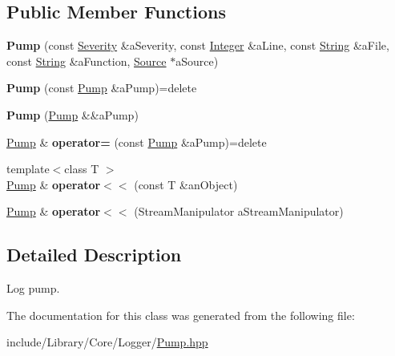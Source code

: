 \subsection*{Public Member Functions}
\begin{DoxyCompactItemize}
\item 
\mbox{\label{classlibrary_1_1core_1_1logger_1_1_pump_af5c515afe6d1ca6c4f388235d4a79562}} 
{\bfseries Pump} (const \hyperlink{_severity_8hpp_a35f71353edf64f68f7fe3874b01abaa8}{Severity} \&a\+Severity, const \hyperlink{classlibrary_1_1core_1_1types_1_1_integer}{Integer} \&a\+Line, const \hyperlink{classlibrary_1_1core_1_1types_1_1_string}{String} \&a\+File, const \hyperlink{classlibrary_1_1core_1_1types_1_1_string}{String} \&a\+Function, \hyperlink{classlibrary_1_1core_1_1logger_1_1_source}{Source} $\ast$a\+Source)
\item 
\mbox{\label{classlibrary_1_1core_1_1logger_1_1_pump_aafed314a368b091eff03f8acf145d6cc}} 
{\bfseries Pump} (const \hyperlink{classlibrary_1_1core_1_1logger_1_1_pump}{Pump} \&a\+Pump)=delete
\item 
\mbox{\label{classlibrary_1_1core_1_1logger_1_1_pump_a1c0e7c1344e56794a715343152d38a19}} 
{\bfseries Pump} (\hyperlink{classlibrary_1_1core_1_1logger_1_1_pump}{Pump} \&\&a\+Pump)
\item 
\mbox{\label{classlibrary_1_1core_1_1logger_1_1_pump_a23a5f5db6b17d42b0738cd4897ce22f5}} 
\hyperlink{classlibrary_1_1core_1_1logger_1_1_pump}{Pump} \& {\bfseries operator=} (const \hyperlink{classlibrary_1_1core_1_1logger_1_1_pump}{Pump} \&a\+Pump)=delete
\item 
\mbox{\label{classlibrary_1_1core_1_1logger_1_1_pump_a97404c60a1271461a10d6a1e894a7810}} 
{\footnotesize template$<$class T $>$ }\\\hyperlink{classlibrary_1_1core_1_1logger_1_1_pump}{Pump} \& {\bfseries operator$<$$<$} (const T \&an\+Object)
\item 
\mbox{\label{classlibrary_1_1core_1_1logger_1_1_pump_a6bc2dee9c4757e5726ce8d25a4126fa4}} 
\hyperlink{classlibrary_1_1core_1_1logger_1_1_pump}{Pump} \& {\bfseries operator$<$$<$} (Stream\+Manipulator a\+Stream\+Manipulator)
\end{DoxyCompactItemize}


\subsection{Detailed Description}
Log pump. 

The documentation for this class was generated from the following file\+:\begin{DoxyCompactItemize}
\item 
include/\+Library/\+Core/\+Logger/\hyperlink{_pump_8hpp}{Pump.\+hpp}\end{DoxyCompactItemize}
